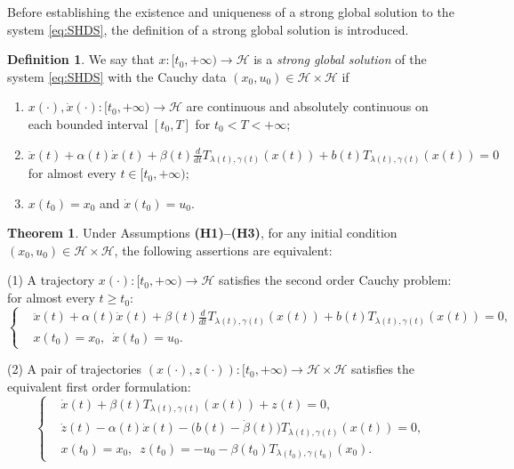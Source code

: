 \documentclass{article}
\theoremstyle{definition}
\newtheorem{theorem}{Theorem}[section]
\theoremstyle{definition}
\newtheorem{definition}{Definition}[section]
\theoremstyle{definition}
\begin{document}
Before establishing the existence and uniqueness of a strong global solution to the system \eqref{eq:SHDS}, the definition of a strong global solution is introduced.
\begin{definition}
\label{def:strong_global_solution}
We say that \( x: [t_0, +\infty) \to \mathcal{H} \) is a {\it strong global solution} of the system \eqref{eq:SHDS} with the Cauchy data \( (x_0, u_0) \in \mathcal{H} \times \mathcal{H} \) if
\begin{enumerate}[label=(\roman*)]
\item $x(\cdot), \dot{x}(\cdot):[t_0, +\infty) \to \mathcal{H}$ are continuous and absolutely continuous on each bounded interval $[t_0, T]$ for $t_0 < T < +\infty$;
\item $\ddot{x}(t) + \alpha(t)\dot{x}(t) + \beta(t)\frac{d}{dt}T_{\lambda(t), \gamma(t)}(x(t)) + b(t)T_{\lambda(t), \gamma(t)}(x(t)) = 0$ for almost every $t \in [t_0, +\infty)$;
\item $x(t_0) = x_0$ and $\dot{x}(t_0) = u_0$.
\end{enumerate}
\end{definition}

\begin{theorem}
\label{thm:First-order formulation} 
Under Assumptions {\rm {\bf (H1)--(H3)}}, for any initial condition $(x_0, u_0) \in \mathcal{H}\times\mathcal{H}$, the following assertions are equivalent:
\vskip 1mm

{\rm(1)} A trajectory $ x(\cdot):[t_0,+\infty)\to\mathcal{H} $ satisfies the second order Cauchy problem: for almost every $t \geq t_0$:
\begin{equation}
\label{eq:SHDS_second_order}
\left\{
\begin{aligned}
&\ddot{x}(t) + \alpha(t)\dot{x}(t) + \beta(t)\frac{d}{dt}T_{\lambda(t), \gamma(t)}(x(t)) + b(t)T_{\lambda(t), \gamma(t)}(x(t)) = 0, \\
&x(t_0) = x_0, \,\,\, \dot{x}(t_0) = u_0.
\end{aligned}
\right.
\end{equation}
    
{\rm(2)} A pair of trajectories $ (x(\cdot),z(\cdot)):[t_0,+\infty)\to\mathcal{H}\times\mathcal{H} $ satisfies the equivalent first order formulation:
\begin{equation}
\label{eq:SHDS_first_order}
\left\{
\begin{aligned}
&\dot{x}(t) + \beta(t)T_{\lambda(t), \gamma(t)}(x(t)) + z(t) = 0, \\
&\dot{z}(t) - \alpha(t)\dot{x}(t) - \big(b(t) - \dot{\beta}(t)\big)T_{\lambda(t), \gamma(t)}(x(t)) = 0, \\
&x(t_0) = x_0, \,\,\, z(t_0) = -u_0 - \beta(t_0)T_{\lambda(t_0), \gamma(t_0)}(x_0).
\end{aligned}
\right.
\end{equation}
\end{theorem}
\end{document}
